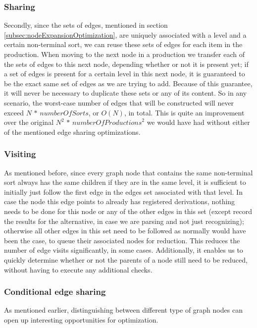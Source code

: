 \documentclass[a4paper,10pt]{article}
\begin{document}
\subsubsection{Sharing}
Secondly, since the sets of edges, mentioned in section \ref{subsec:nodeExpansionOptimization}, are uniquely associated with a level and a certain non-terminal sort, we can reuse these sets of edges for each item in the production. When moving to the next node in a production we transfer each of the sets of edges to this next node, depending whether or not it is present yet; if a set of edges is present for a certain level in this next node, it is guaranteed to be the exact same set of edges as we are trying to add. Because of this guarantee, it will never be necessary to duplicate these sets or any of its content. So in any scenario, the worst-case number of edges that will be constructed will never exceed $N\,*\,\mathit{numberOfSorts}$, or $O(N)$, in total. This is quite an improvement over the original ${N}^2\,*\,\mathit{numberOfProductions}^2$ we would have had without either of the mentioned edge sharing optimizations.

\subsubsection{Visiting}
\label{subsec:edgeVisitOptimization}
As mentioned before, since every graph node that contains the same non-terminal sort always has the same children if they are in the same level, it is sufficient to initially just follow the first edge in the edges set associated with that level. In case the node this edge points to already has registered derivations, nothing needs to be done for this node or any of the other edges in this set (except record the results for the alternative, in case we are parsing and not just recognizing); otherwise all other edges in this set need to be followed as normally would have been the case, to queue their associated nodes for reduction. This reduces the number of edge visits significantly, in some cases. Additionally, it enables us to quickly determine whether or not the parents of a node still need to be reduced, without having to execute any additional checks.

\subsubsection{Conditional edge sharing}
As mentioned earlier, distinguishing between different type of graph nodes can open up interesting opportunities for optimization.
\end{document}
